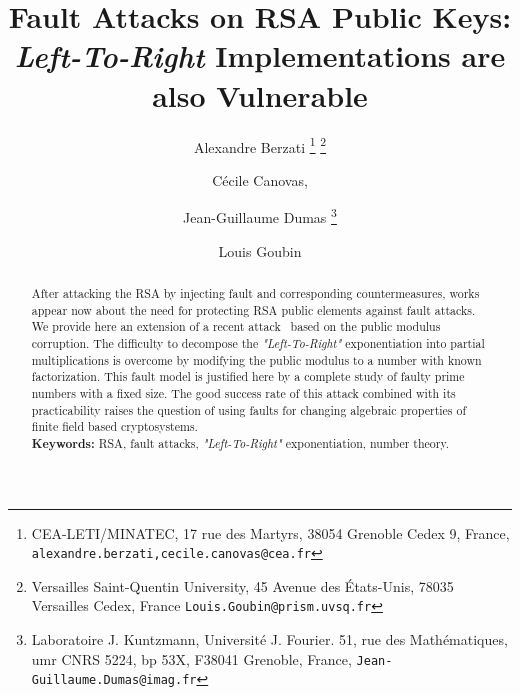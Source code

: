 \documentclass{article}
\title{\textbf{Fault Attacks on RSA Public Keys: \textit{Left-To-Right} Implementations are also Vulnerable}}
\author{
Alexandre Berzati
\thanks{CEA-LETI/MINATEC, 17 rue des
Martyrs, 38054 Grenoble Cedex 9, France,
\texttt{alexandre.berzati,cecile.canovas@cea.fr}}
\thanks{Versailles Saint-Quentin University, 45 Avenue des
  \'Etats-Unis, 78035 Versailles Cedex, France
\texttt{Louis.Goubin@prism.uvsq.fr}}
\and C\'ecile Canovas\footnotemark[1], 
\and Jean-Guillaume Dumas 
\thanks{Laboratoire J. Kuntzmann,
Universit\'e J. Fourier.
51, rue des Math\'ematiques,
umr CNRS 5224, bp 53X,
F38041 Grenoble, France,
\texttt{Jean-Guillaume.Dumas@imag.fr}
}
\and 
Louis Goubin
\footnotemark[2]
}
\begin{document}
\maketitle

\begin{abstract}
After attacking the RSA by injecting fault and corresponding
countermeasures, works appear now about the need for protecting RSA
public elements against fault attacks. We provide here an extension of
a recent attack~\cite{77} based on the public modulus corruption. The
difficulty to decompose the \textit{"Left-To-Right"} exponentiation
into partial multiplications is overcome by modifying the public
modulus to a number with known factorization. This fault model is
justified here by a complete study of faulty prime numbers with a
fixed size. The good success rate of this attack combined with its
practicability raises the question of using faults for changing
algebraic properties of finite field based cryptosystems.
 \vspace{10pt}\\
 \textbf{Keywords:} RSA, fault attacks, \textit{"Left-To-Right"} exponentiation, number theory.

\end{abstract}
\end{document}
